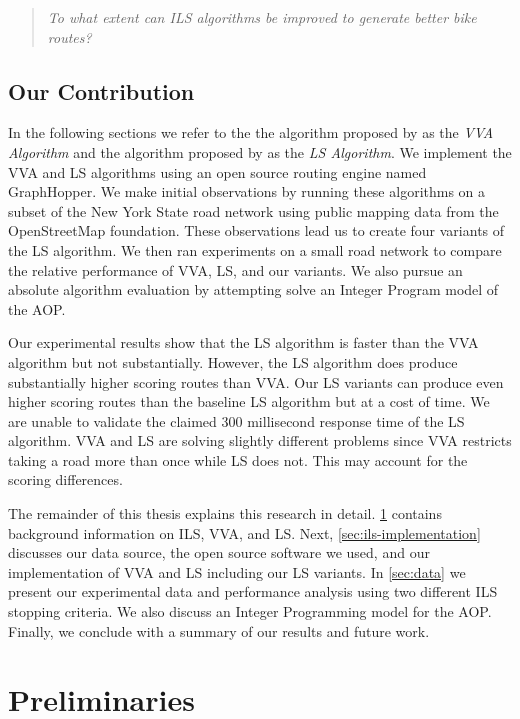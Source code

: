 \documentclass[honors]{union-cs-thesis}
\begin{document}
\begin{quote}
    \emph{To what extent can ILS algorithms be improved to generate better bike routes?}
\end{quote}

\subsection{Our Contribution}
In the following sections we refer to the the algorithm proposed by \citeauthor{verbeeck2014extension} as the \emph{VVA Algorithm} and the algorithm proposed by \citeauthor{lu2015arc} as the \emph{LS Algorithm}. We implement the VVA and LS algorithms using an open source routing engine named GraphHopper. We make initial observations by running these algorithms on a subset of the New York State road network using public mapping data from the OpenStreetMap foundation. These observations lead us to create four variants of the LS algorithm. We then ran experiments on a small road network to compare the relative performance of VVA, LS, and our variants. We also pursue an absolute algorithm evaluation by attempting solve an Integer Program model of the AOP. 

Our experimental results show that the LS algorithm is faster than the VVA algorithm but not substantially. However, the LS algorithm does produce substantially higher scoring routes than VVA. Our LS variants can produce even higher scoring routes than the baseline LS algorithm but at a cost of time. We are unable to validate the claimed 300 millisecond response time of the LS algorithm. VVA and LS are solving slightly different problems since VVA restricts taking a road more than once while LS does not. This may account for the scoring differences.

The remainder of this thesis explains this research in detail. \cref{sec:prelim} contains background information on ILS, VVA, and LS. Next, \cref{sec:ils-implementation} discusses our data source, the open source software we used, and our implementation of VVA and LS including our LS variants. In \cref{sec:data} we present our experimental data and performance analysis using two different ILS stopping criteria. We also discuss an Integer Programming model for the AOP. Finally, we conclude with a summary of our results and future work.

\section{Preliminaries}
\label{sec:prelim}
\end{document}
